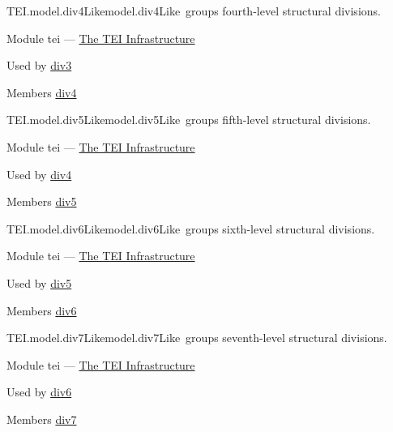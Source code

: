 \begin{reflist}
\item[]\begin{specHead}{TEI.model.div4Like}{model.div4Like} groups fourth-level structural divisions.\end{specHead} 
    \item[{Module}]
  tei — \hyperref[ST]{The TEI Infrastructure}
    \item[{Used by}]
  \hyperref[TEI.div3]{div3}
    \item[{Members}]
  \hyperref[TEI.div4]{div4}
\end{reflist}  
\begin{reflist}
\item[]\begin{specHead}{TEI.model.div5Like}{model.div5Like} groups fifth-level structural divisions.\end{specHead} 
    \item[{Module}]
  tei — \hyperref[ST]{The TEI Infrastructure}
    \item[{Used by}]
  \hyperref[TEI.div4]{div4}
    \item[{Members}]
  \hyperref[TEI.div5]{div5}
\end{reflist}  
\begin{reflist}
\item[]\begin{specHead}{TEI.model.div6Like}{model.div6Like} groups sixth-level structural divisions.\end{specHead} 
    \item[{Module}]
  tei — \hyperref[ST]{The TEI Infrastructure}
    \item[{Used by}]
  \hyperref[TEI.div5]{div5}
    \item[{Members}]
  \hyperref[TEI.div6]{div6}
\end{reflist}  
\begin{reflist}
\item[]\begin{specHead}{TEI.model.div7Like}{model.div7Like} groups seventh-level structural divisions.\end{specHead} 
    \item[{Module}]
  tei — \hyperref[ST]{The TEI Infrastructure}
    \item[{Used by}]
  \hyperref[TEI.div6]{div6}
    \item[{Members}]
  \hyperref[TEI.div7]{div7}
\end{reflist}  
